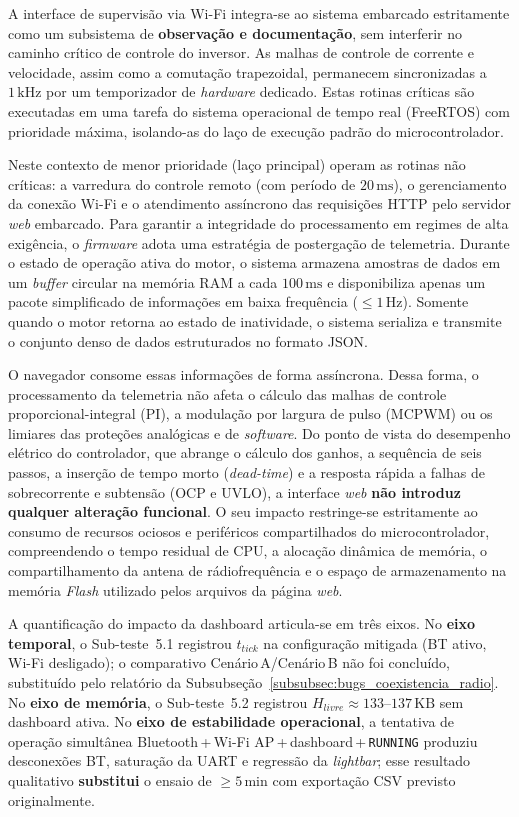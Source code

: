 A interface de supervisão via Wi-Fi integra-se ao sistema embarcado estritamente como um subsistema de \textbf{observação e documentação}, sem interferir no caminho crítico de controle do inversor. As malhas de controle de corrente e velocidade, assim como a comutação trapezoidal, permanecem sincronizadas a $1\,\text{kHz}$ por um temporizador de \textit{hardware} dedicado. Estas rotinas críticas são executadas em uma tarefa do sistema operacional de tempo real (FreeRTOS) com prioridade máxima, isolando-as do laço de execução padrão do microcontrolador.

Neste contexto de menor prioridade (laço principal) operam as rotinas não críticas: a varredura do controle remoto (com período de $20\,\text{ms}$), o gerenciamento da conexão Wi-Fi e o atendimento assíncrono das requisições HTTP pelo servidor \textit{web} embarcado. Para garantir a integridade do processamento em regimes de alta exigência, o \textit{firmware} adota uma estratégia de postergação de telemetria. Durante o estado de operação ativa do motor, o sistema armazena amostras de dados em um \textit{buffer} circular na memória RAM a cada $100\,\text{ms}$ e disponibiliza apenas um pacote simplificado de informações em baixa frequência ($\leq 1\,\text{Hz}$). Somente quando o motor retorna ao estado de inatividade, o sistema serializa e transmite o conjunto denso de dados estruturados no formato JSON.

O navegador consome essas informações de forma assíncrona. Dessa forma, o processamento da telemetria não afeta o cálculo das malhas de controle proporcional-integral (PI), a modulação por largura de pulso (MCPWM) ou os limiares das proteções analógicas e de \textit{software}. Do ponto de vista do desempenho elétrico do controlador, que abrange o cálculo dos ganhos, a sequência de seis passos, a inserção de tempo morto (\textit{dead-time}) e a resposta rápida a falhas de sobrecorrente e subtensão (OCP e UVLO), a interface \textit{web} \textbf{não introduz qualquer alteração funcional}. O seu impacto restringe-se estritamente ao consumo de recursos ociosos e periféricos compartilhados do microcontrolador, compreendendo o tempo residual de CPU, a alocação dinâmica de memória, o compartilhamento da antena de rádiofrequência e o espaço de armazenamento na memória \textit{Flash} utilizado pelos arquivos da página \textit{web}.

A quantificação do impacto da dashboard articula-se em três eixos. No \textbf{eixo temporal}, o Sub-teste~5.1 registrou $t_{tick}$ na configuração mitigada (BT ativo, Wi-Fi desligado); o comparativo Cenário\,A/Cenário\,B não foi concluído, substituído pelo relatório da Subsubseção~\ref{subsubsec:bugs_coexistencia_radio}. No \textbf{eixo de memória}, o Sub-teste~5.2 registrou $H_{livre} \approx 133$--$137\,\text{KB}$ sem dashboard ativa. No \textbf{eixo de estabilidade operacional}, a tentativa de operação simultânea Bluetooth\,+\,Wi-Fi AP\,+\,dashboard\,+\,\texttt{RUNNING} produziu desconexões BT, saturação da UART e regressão da \textit{lightbar}; esse resultado qualitativo \textbf{substitui} o ensaio de $\geq 5\,\text{min}$ com exportação CSV previsto originalmente.

